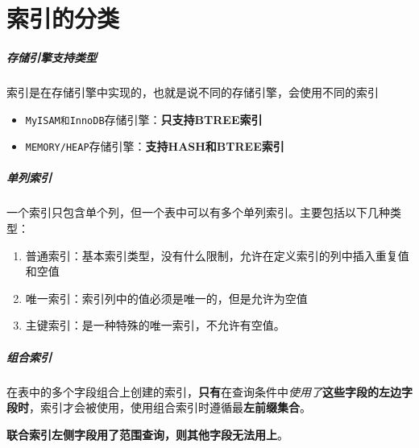 \documentclass[UTF8,a4paper,12pt]{ctexbook}
\begin{document}
	\section{索引的分类}
		\subparagraph{存储引擎支持类型}
			索引是在存储引擎中实现的，也就是说不同的存储引擎，会使用不同的索引
			\begin{itemize}[itemindent = 2em]
				\item \verb|MyISAM和InnoDB|存储引擎：\textbf{只支持BTREE索引}
				\item \verb|MEMORY/HEAP|存储引擎：\textbf{支持HASH和BTREE索引}
			\end{itemize}
			
		\subparagraph{单列索引}
			一个索引只包含单个列，但一个表中可以有多个单列索引。主要包括以下几种类型：
			\begin{enumerate}[itemindent = 2em]
				\item 普通索引：基本索引类型，没有什么限制，允许在定义索引的列中插入重复值和空值
				\item 唯一索引：索引列中的值必须是唯一的，但是允许为空值
				\item 主键索引：是一种特殊的唯一索引，不允许有空值。
			\end{enumerate}
			
		\subparagraph{组合索引}
			在表中的多个字段组合上创建的索引，\textbf{只有}在查询条件中\textit{使用了}\textbf{这些字段的左边字段时}，索引才会被使用，使用组合索引时遵循最\textbf{左前缀集合}。
		
			\textbf{联合索引左侧字段用了范围查询，则其他字段无法用上}。
			
\end{document}
